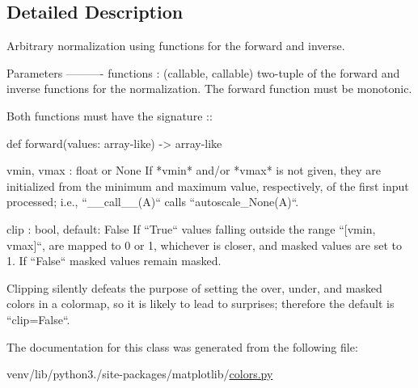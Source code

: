 \subsection{Detailed Description}
\begin{DoxyVerb}Arbitrary normalization using functions for the forward and inverse.

Parameters
----------
functions : (callable, callable)
    two-tuple of the forward and inverse functions for the normalization.
    The forward function must be monotonic.

    Both functions must have the signature ::

       def forward(values: array-like) -> array-like

vmin, vmax : float or None
    If *vmin* and/or *vmax* is not given, they are initialized from the
    minimum and maximum value, respectively, of the first input
    processed; i.e., ``__call__(A)`` calls ``autoscale_None(A)``.

clip : bool, default: False
    If ``True`` values falling outside the range ``[vmin, vmax]``,
    are mapped to 0 or 1, whichever is closer, and masked values are
    set to 1.  If ``False`` masked values remain masked.

    Clipping silently defeats the purpose of setting the over, under,
    and masked colors in a colormap, so it is likely to lead to
    surprises; therefore the default is ``clip=False``.
\end{DoxyVerb}
 

The documentation for this class was generated from the following file\+:\begin{DoxyCompactItemize}
\item 
venv/lib/python3./site-\/packages/matplotlib/\hyperlink{colors_8py}{colors.\+py}\end{DoxyCompactItemize}
